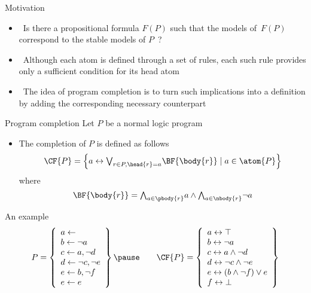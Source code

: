 \begin{frame}{Motivation}
  \bigskip
  \begin{itemize}
  \item<1->  \
    Is there a propositional formula $F(P)$ such that the models of~$F(P)$ correspond to the
    stable models of $P$~?
    \bigskip
  \item<2->  \
    Although each atom is defined through a set of rules,
    each such rule provides only a \alert{sufficient} condition for its head atom
    \medskip
  \item<3-> \structure{Idea} \
    The idea of program completion is to turn such implications into a definition
    by adding the corresponding \alert{necessary} counterpart
  \end{itemize}
\end{frame}
\begin{frame}{Program completion}
  Let $P$ be a normal logic program
  \bigskip
  \begin{itemize}
  \item
    The \alert{completion}  of $P$ is defined as follows
    \[
    \CF{P}
    =
    \left\{a \leftrightarrow \textstyle{\bigvee_{r\in P, \head{r} = a}} \BF{\body{r}} \mid a\in\atom{P}\right\}
    \]
    where
    \[
    \BF{\body{r}}
    =
    \textstyle{\bigwedge_{a\in\pbody{r}}}      a
    \wedge
    \textstyle{\bigwedge_{a\in\nbody{r}}} \neg a
    \]
  \end{itemize}
\end{frame}
\begin{frame}{An example}
\[
P
=
\left\{
  \begin{array}{l}
    a \leftarrow                  \\
    b \leftarrow \neg a          \\
    c \leftarrow a, \neg d       \\
    d \leftarrow \neg c, \neg e \\
    e \leftarrow b, \neg f       \\
    e \leftarrow e
  \end{array}
\right\}
\pause\qquad
\CF{P}
=
\left\{
  \begin{array}{l}
    a \leftrightarrow \top                  \\
    b \leftrightarrow \neg{a}               \\
    c \leftrightarrow a\wedge \neg{d}       \\
    d \leftrightarrow \neg{c}\wedge \neg{e} \\
    e \leftrightarrow (b\wedge \neg{f}) \vee e\\
    f \leftrightarrow \bot
  \end{array}
\right\}
\]
\end{frame}
